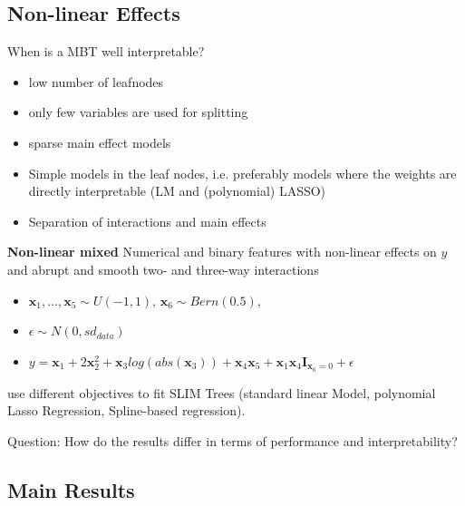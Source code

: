 \subsection{Non-linear Effects}
When is a MBT well interpretable?
\begin{itemize}
    \item low number of leafnodes
    \item only few variables are used for splitting
    \item sparse main effect models
    \item Simple models in the leaf nodes, i.e. preferably models where the weights are directly interpretable (LM and (polynomial) LASSO)
    \item Separation of interactions and main effects
\end{itemize}
\textbf{Non-linear mixed}
Numerical and binary features with non-linear effects on $y$ and abrupt and smooth two- and three-way interactions
\begin{itemize}
    \item $\textbf{x}_1, ..., \textbf{x}_5 \sim U(-1,1)$, $\textbf{x}_6 \sim Bern(0.5)$,  
    \item $\epsilon \sim N(0, sd_{data})$
    \item $y = \textbf{x}_1 + 2 \textbf{x}_2^2 + \textbf{x}_3log(abs(\textbf{x}_3)) + \textbf{x}_4\textbf{x}_5 + \textbf{x}_1\textbf{x}_4\mathbf{I}_{\textbf{x}_6 = 0}+ \epsilon$
\end{itemize}
use different objectives to fit SLIM Trees (standard linear Model, polynomial Lasso Regression, Spline-based regression).

Question: How do the results differ in terms of performance and interpretability?






\subsection{Main Results}

